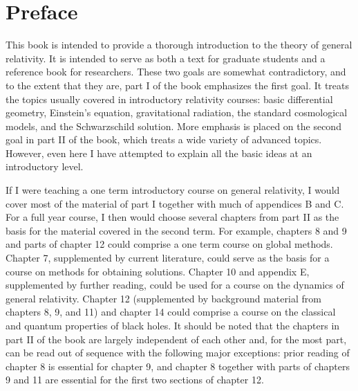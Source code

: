 \chapter*{Preface}
This book is intended to provide a thorough introduction to the theory of general relativity. It is intended to serve as both a text for graduate students and a reference book for researchers. These two goals are somewhat contradictory, and to the extent that they are, part I of the book emphasizes the first goal. It treats the topics usually covered in introductory relativity courses: basic differential geometry, Einstein's equation, gravitational radiation, the standard cosmological models, and the Schwarzschild solution. More emphasis is placed on the second goal in part II of the book, which treats a wide variety of advanced topics. However, even here I have attempted to explain all the basic ideas at an introductory level.

If I were teaching a one term introductory course on general relativity, I would cover most of the material of part I together with much of appendices B and C. For a full year course, I then would choose several chapters from part II as the basis for the material covered in the second term. For example, chapters 8 and 9 and parts of chapter 12 could comprise a one term course on global methods. Chapter 7, supplemented by current literature, could serve as the basis for a course on methods for obtaining solutions. Chapter 10 and appendix E, supplemented by further reading, could be used for a course on the dynamics of general relativity. Chapter 12 (supplemented by background material from chapters 8, 9, and 11) and chapter 14 could comprise a course on the classical and quantum properties of black holes. It should be noted that the chapters in part II of the book are largely independent of each other and, for the most part, can be read out of sequence with the following major exceptions: prior reading of chapter 8 is essential for chapter 9, and chapter 8 together with parts of chapters 9 and 11 are essential for the first two sections of chapter 12.

